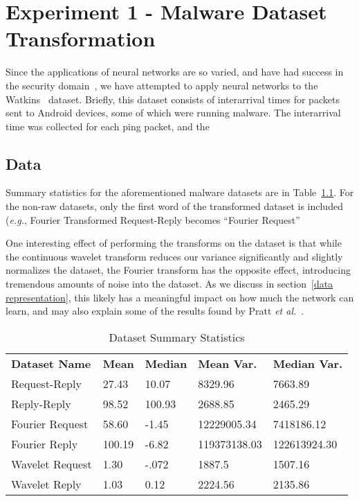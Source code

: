 \chapter{Experiment 1 - Malware Dataset Transformation}
\label{chap:three}

Since the applications of neural networks are so varied, and have had success in the security domain~\cite{raff2018malware}, we have attempted to apply neural networks to the Watkins~\cite{watkins2013using} dataset.
Briefly, this dataset consists of interarrival times for packets sent to Android devices, some of which were running malware.
The interarrival time was collected for each ping packet, and the 

\section{Data}
Summary statistics for the aforementioned malware datasets are in Table~\ref{Tab:summary}. 
For the non-raw datasets, only the first word of the transformed dataset is included (\textit{e.g.}, Fourier Transformed Request-Reply becomes ``Fourier Request''

One interesting effect of performing the transforms on the dataset is that while the continuous wavelet transform reduces our variance significantly and slightly normalizes the dataset, the Fourier transform has the opposite effect, introducing tremendous amounts of noise into the dataset.
As we discuss in section~\ref{data representation}, this likely has a meaningful impact on how much the network can learn, and may also explain some of the results found by Pratt \textit{et al.}~\cite{pratt2017fcnn}.

\renewcommand{\thefootnote}{*} 
\begin{table}[h]
\caption{Dataset Summary Statistics}
\centering
\label{Tab:summary}	
\begin{tabular}{l|llll}
\textbf{Dataset Name} & \textbf{Mean} & \textbf{Median} & \textbf{Mean Var.} & \textbf{Median Var.} \\\cline{1-5}
Request-Reply         & 27.43    & 10.07    & 8329.96    & 7663.89 \\
Reply-Reply           & 98.52    & 100.93   & 2688.85    & 2465.29 \\
Fourier Request       & 58.60\footnotemark    & -1.45    & 12229005.34    & 7418186.12 \\
Fourier Reply         & 100.19\footnotemark    & -6.82    & 119373138.03    & 122613924.30 \\
Wavelet Request       & 1.30    & -.072    & 1887.5    & 1507.16 \\
Wavelet Reply         & 1.03    & 0.12    & 2224.56    & 2135.86                 
\end{tabular}
\end{table}

